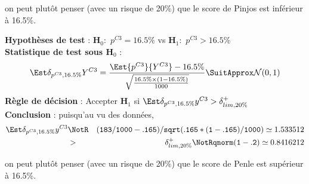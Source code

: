 \documentclass[10pt]{report}
\begin{document}
\begin{exercice}
\begin{enumerate}
\begin{Correction}
on peut plutôt penser (avec un risque de 20\%) que le score de Pinjos est inférieur à 16.5\%.

\noindent \textbf{Hypothèses de test} : $\mathbf{H}_0:$ $p^{C3}=16.5\%$ vs {\large $\mathbf{H}_1:$ $p^{C3}>16.5\%$}\\
\textbf{Statistique de test sous $\mathbf{H}_0$} :
  $$
  \Est{\delta_{p^{C3},16.5\%}}{Y^{C3}}= {\displaystyle \frac{\Est{p^{C3}}{Y^{C3}}-16.5\%}{
\sqrt{\frac{16.5\%\times (1-16.5\%)} {1000}}
}} 
  \SuitApprox \mathcal{N}(0,1)
  $$
\textbf{Règle de décision} : Accepter $\mathbf{H}_1$ si 
  $\Est{\delta_{p^{C3},16.5\%}}{y^{C3}} > \delta^+_{lim,20\%}$\\
\noindent \textbf{Conclusion} :
puisqu'au vu des données, 
  \begin{eqnarray*}
\Est{\delta_{p^{C3},16.5\%}}{y^{C3}} &\NotR&\mathtt{(183/1000-.165)/sqrt(.165*(1-.165)/1000)}\simeq 1.533512\\& >  & \delta^+_{lim,20\%} \NotR \mathtt{qnorm(1-.2)}\simeq0.8416212
\end{eqnarray*}
  
on peut plutôt penser (avec un risque de 20\%) que le score de Penle est supérieur à 16.5\%.
\end{Correction}



\end{enumerate}

\end{exercice}
\end{document}

